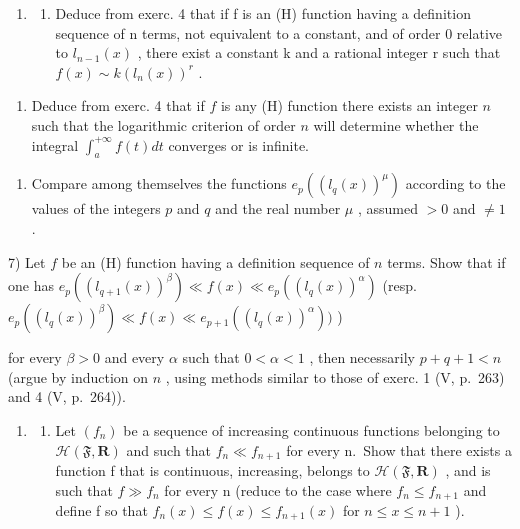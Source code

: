 \begin{enumerate}
\def\labelenumi{\arabic{enumi})}
\setcounter{enumi}{4}
\tightlist
\item
  \begin{enumerate}
  \def\labelenumii{\alph{enumii})}
  \tightlist
  \item
    Deduce from exerc. 4 that if f is an (H) function having a definition sequence of n terms, not equivalent to a constant, and of order 0 relative to \(l_{n-1}(x)\) , there exist a constant k and a rational integer r such that \(f(x) \sim k(l_n(x))^r\) .
  \end{enumerate}
\end{enumerate}

\begin{enumerate}
\def\labelenumi{\alph{enumi})}
\setcounter{enumi}{1}
\tightlist
\item
  Deduce from exerc. 4 that if \(f\) is any (H) function there exists an integer \(n\) such that the logarithmic criterion of order \(n\) will determine whether the integral \(\int_{a}^{+\infty} f(t) dt\) converges or is infinite.
\end{enumerate}

\begin{enumerate}
\def\labelenumi{\arabic{enumi})}
\setcounter{enumi}{5}
\tightlist
\item
  Compare among themselves the functions \(e_p\left((l_q(x))^{\mu}\right)\) according to the values of the integers \(p\) and \(q\) and the real number \(\mu\) , assumed \(> 0\) and \(\neq 1\) .
\end{enumerate}

7) Let \(f\) be an (H) function having a definition sequence of \(n\) terms. Show that if one has \(e_p((l_{q+1}(x))^{\beta}) \ll f(x) \ll e_p((l_q(x))^{\alpha})\) (resp. \(e_p((l_q(x))^{\beta}) \ll f(x) \ll e_{p+1}((l_q(x))^{\alpha}))\) )

for every \(\beta > 0\) and every \(\alpha\) such that \(0 < \alpha < 1\) , then necessarily \(p + q + 1 < n\) (argue by induction on \(n\) , using methods similar to those of exerc. 1 (V, p.~263) and 4 (V, p.~264)).

\begin{enumerate}
\def\labelenumi{\arabic{enumi})}
\setcounter{enumi}{7}
\tightlist
\item
  \begin{enumerate}
  \def\labelenumii{\alph{enumii})}
  \tightlist
  \item
    Let \((f_{n})\) be a sequence of increasing continuous functions belonging to \(\mathcal{H}(\mathfrak{F},\mathbf{R})\) and such that \(f_{n} \ll f_{n+1}\) for every n.~Show that there exists a function f that is continuous, increasing, belongs to \(\mathcal{H}(\mathfrak{F},\mathbf{R})\) , and is such that \(f \gg f_{n}\) for every n (reduce to the case where \(f_{n} \leqslant f_{n+1}\) and define f so that \(f_{n}(x) \leqslant f(x) \leqslant f_{n+1}(x)\) for \(n \leqslant x \leqslant n+1\) ).
  \end{enumerate}
\end{enumerate}

